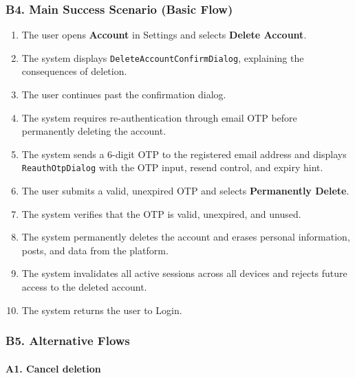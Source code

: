 \documentclass[12pt]{article}
\begin{document}
\hypertarget{sec:b4-main-success-scenario-basic-flow}{}
\subsubsection*{B4. Main Success Scenario (Basic Flow)}
\par\medskip

\begin{enumerate}
\item The user opens \textbf{Account} in Settings and selects \textbf{Delete Account}.
\item The system displays \texttt{DeleteAccountConfirmDialog}, explaining the consequences of deletion.
\item The user continues past the confirmation dialog.
\item The system requires re-authentication through email OTP before permanently deleting the account.
\item The system sends a 6-digit OTP to the registered email address and displays \texttt{ReauthOtpDialog} with the OTP input, resend control, and expiry hint.
\item The user submits a valid, unexpired OTP and selects \textbf{Permanently Delete}.
\item The system verifies that the OTP is valid, unexpired, and unused.
\item The system permanently deletes the account and erases personal information, posts, and data from the platform.
\item The system invalidates all active sessions across all devices and rejects future access to the deleted account.
\item The system returns the user to Login.
\end{enumerate}
\par\medskip

\hypertarget{sec:b5-alternative-flows}{}
\subsubsection*{B5. Alternative Flows}
\par\medskip

\hypertarget{sec:a1-cancel-deletion}{}
\paragraph*{A1. Cancel deletion}
\par\medskip
\end{document}
